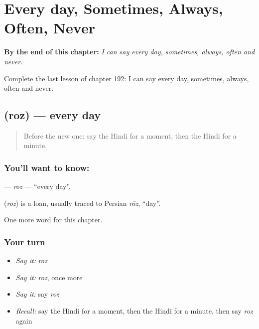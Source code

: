 
\chapter{Every day, Sometimes, Always, Often, Never}
\label{ch:hi-every-day-sometimes-always-often-never}

\begin{chapteropening}
\textbf{By the end of this chapter:} \emph{I can say every day, sometimes, always, often and never.}

Complete the last lesson of chapter 192: I can say every day, sometimes, always, often and never.
\end{chapteropening}

\section[\texorpdfstring{\hi{रोज़} (roz)}{रोज़ (roz)}]{ (roz) — every day}

\label{lesson:HI-C192-roz}



\begin{quote}
Before the new one: say the Hindi for a moment, then the Hindi for a minute.
\end{quote}

\subsection*{You'll want to know: }
\textbf{} — \emph{roz} — \textquotedblleft{}every day\textquotedblright{}.

\begin{cousinweb}
\textbf{} (\emph{roz}) is a loan, usually traced to Persian \emph{rōz}, \textquotedblleft{}day\textquotedblright{}.
\end{cousinweb}

\begin{grammarlens}[title={What you've built}]
One more word for this chapter.
\end{grammarlens}

\subsection*{Your turn}
\begin{itemize}
\raggedright
  \item \emph{Say it:} \emph{roz}
  \item \emph{Say it:} \emph{roz}, once more
  \item \emph{Say it:} say \emph{roz}
  \item \emph{Recall:} say the Hindi for a moment, then the Hindi for a minute, then say \emph{roz} again
\end{itemize}

